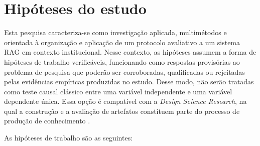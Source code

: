 \section{Hipóteses do estudo}

Esta pesquisa caracteriza-se como investigação aplicada, multimétodos e orientada à organização e aplicação de um protocolo avaliativo a um sistema RAG em contexto institucional. Nesse contexto, as hipóteses assumem a forma de hipóteses de trabalho verificáveis, funcionando como respostas provisórias ao problema de pesquisa que poderão ser corroboradas, qualificadas ou rejeitadas pelas evidências empíricas produzidas no estudo. Desse modo, não serão tratadas como teste causal clássico entre uma variável independente e uma variável dependente única. Essa opção é compatível com a \textit{Design Science Research}, na qual a construção e a avaliação de artefatos constituem parte do processo de produção de conhecimento \parencite{hevnerEtAl2004designScience,peffersEtAl2007dsrm}.

As hipóteses de trabalho são as seguintes:

